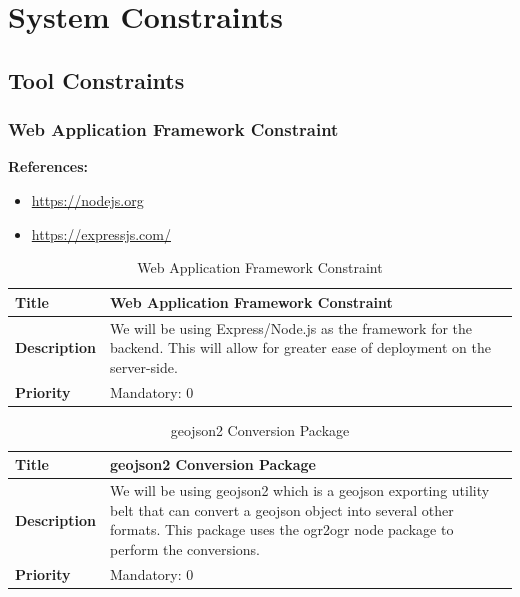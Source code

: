 \documentclass{article}
\begin{document}
\pagebreak

\section{System Constraints}

\subsection{Tool Constraints}

\subsubsection{Web Application Framework Constraint}

\textbf{References:}
\begin{itemize}
	\item \url{https://nodejs.org}
	\item \url{https://expressjs.com/}
\end{itemize}

\begin{table}[H]
	\caption{Web Application Framework Constraint}
	\begin{tabularx}{\textwidth}{|l|X|}
		\hline
		\textbf{Title}       & Web Application Framework Constraint              \\ \hline
		\textbf{Description} & We will be using Express/Node.js as the framework
		for the backend. This will allow for greater ease of deployment on the
		server-side. \\ \hline
		\textbf{Priority}    & Mandatory: 0                                      \\ \hline
	\end{tabularx}
\end{table}

\begin{table}[H]
	\caption{geojson2 Conversion Package}
	\begin{tabularx}{\textwidth}{|l|X|}
		\hline
		\textbf{Title}       & geojson2 Conversion Package             \\ \hline
		\textbf{Description} & We will be using geojson2 which is a geojson exporting utility belt that can convert a geojson object into several other formats. This package uses the ogr2ogr node package to perform the conversions.      \\ \hline
		\textbf{Priority}    & Mandatory: 0 \\ \hline
	\end{tabularx}
\end{table}
\end{document}
